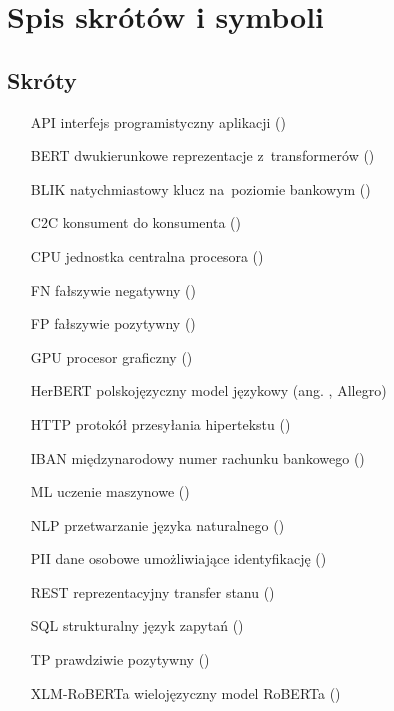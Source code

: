 \chapter{Spis skrótów i symboli}

\section*{Skróty}

\begin{itemize}
\item[API] interfejs programistyczny aplikacji ()
\item[BERT] dwukierunkowe reprezentacje z~transformerów ()
\item[BLIK] natychmiastowy klucz na~poziomie bankowym ()
\item[C2C] konsument do konsumenta ()
\item[CPU] jednostka centralna procesora ()
\item[FN] fałszywie negatywny ()
\item[FP] fałszywie pozytywny ()
\item[GPU] procesor graficzny ()
\item[HerBERT] polskojęzyczny model językowy (ang. , Allegro)
\item[HTTP] protokół przesyłania hipertekstu ()
\item[IBAN] międzynarodowy numer rachunku bankowego ()
\item[ML] uczenie maszynowe ()
\item[NLP] przetwarzanie języka naturalnego ()
\item[PII] dane osobowe umożliwiające identyfikację ()
\item[REST] reprezentacyjny transfer stanu ()
\item[SQL] strukturalny język zapytań ()
\item[TP] prawdziwie pozytywny ()
\item[XLM-RoBERTa] wielojęzyczny model RoBERTa ()
\end{itemize}

